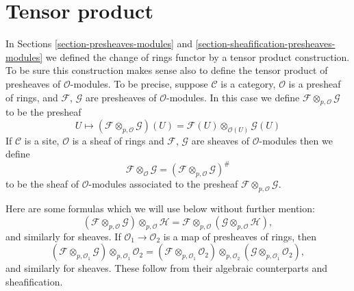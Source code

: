 











\section{Tensor product}
\label{section-tensor-product}

\noindent
In Sections \ref{section-presheaves-modules} and
\ref{section-sheafification-presheaves-modules}
we defined the change of rings functor by a tensor
product construction. To be sure this construction makes sense also
to define the tensor product of presheaves of $\mathcal{O}$-modules.
To be precise, suppose $\mathcal{C}$ is a category,
$\mathcal{O}$ is a presheaf of rings, and $\mathcal{F}$, $\mathcal{G}$
are presheaves of $\mathcal{O}$-modules. In this case we define
$\mathcal{F} \otimes_{p, \mathcal{O}} \mathcal{G}$ to be the presheaf
$$
U
\longmapsto
(\mathcal{F} \otimes_{p, \mathcal{O}} \mathcal{G})(U)
=
\mathcal{F}(U) \otimes_{\mathcal{O}(U)} \mathcal{G}(U)
$$
If $\mathcal{C}$ is a site, $\mathcal{O}$ is a sheaf of rings and
$\mathcal{F}$, $\mathcal{G}$ are sheaves of $\mathcal{O}$-modules
then we define
$$
\mathcal{F} \otimes_\mathcal{O} \mathcal{G}
=
(\mathcal{F} \otimes_{p, \mathcal{O}} \mathcal{G})^\#
$$
to be the sheaf of $\mathcal{O}$-modules associated to the presheaf
$\mathcal{F} \otimes_{p, \mathcal{O}} \mathcal{G}$.

\medskip\noindent
Here are some formulas which we will use below without further mention:
$$
(\mathcal{F}
\otimes_{p, \mathcal{O}} \mathcal{G})
\otimes_{p, \mathcal{O}} \mathcal{H}
=
\mathcal{F}
\otimes_{p, \mathcal{O}} (\mathcal{G}
\otimes_{p, \mathcal{O}} \mathcal{H}),
$$
and similarly for sheaves.
If $\mathcal{O}_1 \to \mathcal{O}_2$ is a map of presheaves of rings,
then
$$
(\mathcal{F} \otimes_{p, \mathcal{O}_1} \mathcal{G})
\otimes_{p, \mathcal{O}_1} \mathcal{O}_2 =
(\mathcal{F} \otimes_{p, \mathcal{O}_1} \mathcal{O}_2)
\otimes_{p, \mathcal{O}_2}
(\mathcal{G} \otimes_{p, \mathcal{O}_1} \mathcal{O}_2),
$$
and similarly for sheaves.
These follow from their algebraic counterparts and sheafification.

